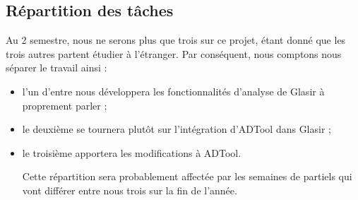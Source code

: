	\subsection{Répartition des tâches}
	Au 2 semestre, nous ne serons plus que trois sur ce projet, étant donné que les trois autres partent étudier à l'étranger. Par conséquent, nous comptons nous séparer le travail ainsi :
	\begin{itemize}
	\item l'un d'entre nous développera les fonctionnalités d'analyse de Glasir à proprement parler ;
	\item le deuxième se tournera plutôt sur l'intégration d'ADTool dans Glasir ;
	\item le troisième apportera les modifications à ADTool.
	
	Cette répartition sera probablement affectée par les semaines de partiels qui vont différer entre nous trois sur la fin de l'année.
	\end{itemize}
